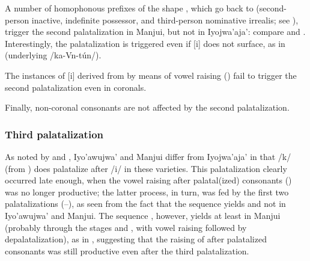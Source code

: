 A number of homophonous prefixes of the shape , which go back to  (second-person inactive, indefinite possessor, and third-person nominative irrealis; see ), trigger the second palatalization in Manjui, but not in Iyojwa’aja’: compare  and . Interestingly, the palatalization is triggered even if [i] does not surface, as in  (underlying /ka\mbox{-}Vn\mbox{-}tún/).

The instances of [i] derived from  by means of vowel raising () fail to trigger the second palatalization even in coronals.

\begin{exe}
    \ex {}
    \ex {}
    \ex {}
    \ex {}
\end{exe}

Finally, non-coronal consonants are not affected by the second palatalization. 

\begin{exe}
    \ex {}
    \ex {}
    \ex {}
    \ex {}
    \ex {}
    \ex {}
\end{exe}

\subsubsection{Third palatalization}\label{ch-pal3}

As noted by \citet[43]{AG83} and \citet[100, fn. 36]{JC14b}, Iyo’awujwa’ and Manjui differ from Iyojwa’aja’ in that /k/ (from ) does palatalize after /i/ in these varieties. This palatalization clearly occurred late enough, when the vowel raising after palatal(ized) consonants () was no longer productive; the latter process, in turn, was fed by the first two palatalizations (--), as seen from the fact that the sequence  yields  and not  in Iyo’awujwa’ and Manjui. The sequence , however, yields  at least in Manjui (probably through the stages  and , with vowel raising followed by depalatalization), as in , suggesting that the raising of  after palatalized consonants was still productive even after the third palatalization.

